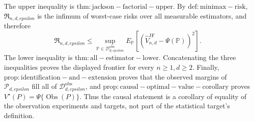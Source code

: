 The upper inequality is \(\mathrm{thm:jackson-factorial-upper}\).  By \(\mathrm{def:minimax-risk}\), \(\mathfrak R_{n,d,epsilon}\) is the infimum of worst-case risks over all measurable estimators, and therefore
\[
 \mathfrak R_{n,d,epsilon}
 \leq\sup_{\mathbb P\in\mathcal D_{d,epsilon}^{\mathrm{obs}}}
 E_{\mathbb P}[(\widehat V_{n,d}^{\mathrm{JF}}-\Psi(\mathbb P))^2].
\]
The lower inequality is \(\mathrm{thm:all-estimator-lower}\).  Concatenating the three inequalities proves the displayed frontier for every \(n\geq1,d\geq2\).  Finally, \(\mathrm{prop:identification-and-extension}\) proves that the observed margins of \(\mathcal P_{d,epsilon}\) fill all of \(\mathcal D_{d,epsilon}^{\mathrm{obs}}\), and \(\mathrm{prop:causal-optimal-value-corollary}\) proves \(V^\star(P)=\Psi\{\operatorname{Obs}(P)\}\).  Thus the causal statement is a corollary of equality of the observation experiments and targets, not part of the statistical target's definition.